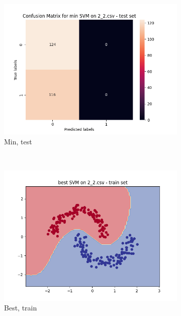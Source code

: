 \documentclass[12pt]{article}
\newcommand*{\subfigwidth}{0.24\textwidth}
\begin{document}
\begin{figure}[H]
\begin{subfigure}[t]{\subfigwidth}
        \includegraphics[width=\linewidth]{img/exp_2/svm/2_2/min/test_matrix.png}
        \caption{Min, test}
    \end{subfigure} 
    \\
    \begin{subfigure}[t]{\subfigwidth}
        \includegraphics[width=\linewidth]{img/exp_2/svm/2_2/best/train_boundary.png}
        \caption{Best, train}
    \end{subfigure}
    \hfill
    \begin{subfigure}[t]{\subfigwidth}

\end{subfigure}
\end{figure}
\end{document}
